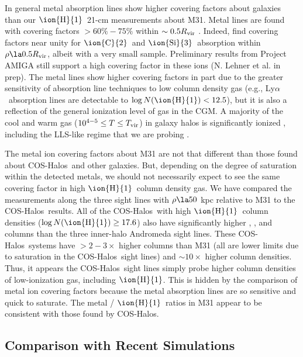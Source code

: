 \documentclass[12pt,preprint]{aastex6}
\newcommand{\HI}{\ensuremath{\mbox{\ion{H}{1}}}}
\newcommand{\SiIII}{\ensuremath{\mbox{\ion{Si}{3}}}}
\newcommand{\CII}{\ensuremath{\mbox{\ion{C}{2}}}}
\newcommand{\lya}{Ly$\alpha$\relax}
\newcommand{\logNHI}{\ensuremath{\log N(\mbox{\ion{H}{1}})}\relax}
\newcommand{\Rvir}{\ensuremath{R_{\rm vir}}\relax}
\newcommand{\coshalos}{COS-Halos}
\begin{document}
In general metal absorption lines show higher covering factors about
galaxies than our \HI\ 21-cm measurements about M31. Metal lines are
found with covering factors $>60\% - 75\%$ within $\sim0.5 \Rvir$
\citep[e.g.,][]{chen2010, nielsen2013, stocke2013, werk2014,
  borthakur2016}. Indeed,  find covering
factors near unity for \CII\ and \SiIII\ absorption within
$\rho \la 0.5 \Rvir$, albeit with a very small sample. Preliminary
results from Project AMIGA still support a high covering factor in
these ions (N. Lehner et al. in prep). The metal lines show higher
covering factors in part due to the greater sensitivity of absorption
line techniques to low column density gas (e.g., \lya\ absorption
lines are detectable to $\logNHI < 12.5$), but it is also a reflection
of the general ionization level of gas in the CGM. A majority of the
cool and warm gas ($10^{4-5} \le T \le T_{\rm vir}$) in galaxy halos
is significantly ionized \citep[][]{werk2014,keeney2017}, including
the LLS-like regime that we are probing \citep{lehner2013,
  fumagalli2016, lehner2016}.

The metal ion covering factors about M31 are not that different than
those found about \coshalos\ and other galaxies. But, depending on the
degree of saturation within the detected metals, we should not
necessarily expect to see the same covering factor in high \HI\ column
density gas. We have compared the  measurements
along the three sight lines with $\rho \la 50$ kpc relative to
M31 to the \coshalos\ results. All of the \coshalos\ with high
\HI\ column densities ($\logNHI \ge 17.6$) also have significantly
higher , , and  columns than the three
inner-halo Andromeda sight lines. These \coshalos\ systems have
$>2-3\times$ higher  columns than M31 (all are lower limits
due to saturation in the \coshalos\ sight lines) and $\sim10\times$
higher  column densities. Thus, it appears the \coshalos\
sight lines simply probe higher column densities of low-ionization
gas, including \HI. This is hidden by the comparison of metal ion
covering factors because the metal absorption lines are so sensitive
and quick to saturate. The metal / \HI\ ratios in M31 appear to be
consistent with those found by \coshalos.

\subsection{Comparison with Recent Simulations}
\end{document}
